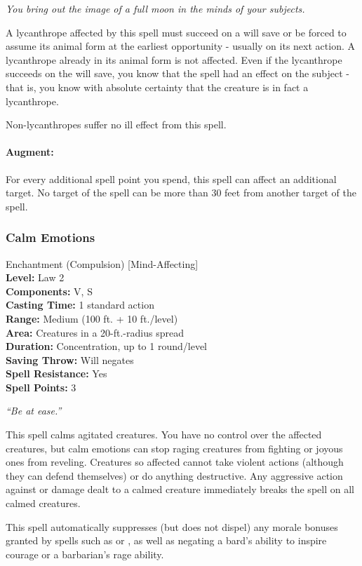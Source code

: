 \emph{You bring out the image of a full moon in the minds of your subjects.}

A lycanthrope affected by this spell must succeed on a will save or be forced to assume its animal form at the earliest opportunity - usually on its next action. A lycanthrope already in its animal form is not affected.
Even if the lycanthrope succeeds on the will save, you know that the spell had an effect on the subject - that is, you know with absolute certainty that the creature is in fact a lycanthrope.

Non-lycanthropes suffer no ill effect from this spell.
\paragraph{Augment:}
For every additional spell point you spend, this spell can affect an additional target.%
No target of the spell can be more than 30 feet from another target of the spell.
\subsubsection{Calm Emotions}
\label{Spell:CalmEmotions}
Enchantment (Compulsion) [Mind-Affecting]
\\ \textbf{Level:} Law 2
\\ \textbf{Components:} V, S
\\ \textbf{Casting Time:} 1 standard action
\\ \textbf{Range:} Medium (100 ft. + 10 ft./level)
\\ \textbf{Area:} Creatures in a 20-ft.-radius spread
\\ \textbf{Duration:} Concentration, up to 1 round/level
\\ \textbf{Saving Throw:} Will negates
\\ \textbf{Spell Resistance:} Yes
\\ \textbf{Spell Points:} 3

\emph{``Be at ease.''}

This spell calms agitated creatures. 
You have no control over the affected creatures, but calm emotions can stop raging creatures from fighting or joyous ones from reveling. 
Creatures so affected cannot take violent actions (although they can defend themselves) or do anything destructive. 
Any aggressive action against or damage dealt to a calmed creature immediately breaks the spell on all calmed creatures.

This spell automatically suppresses (but does not dispel) any morale bonuses granted by spells such as  or , 
as well as negating a bard's ability to inspire courage or a barbarian's rage ability. 

